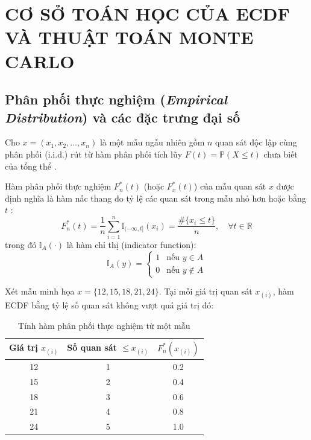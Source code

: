 	\section{CƠ SỞ TOÁN HỌC CỦA ECDF VÀ THUẬT TOÁN MONTE CARLO}
	
	\subsection{Phân phối thực nghiệm (\textit{Empirical Distribution}) và các đặc trưng đại số}
	Cho $x = (x_1, x_2, \dots, x_n)$ là một mẫu ngẫu nhiên gồm $n$ quan sát độc lập cùng phân phối (i.i.d.) rút từ hàm phân phối tích lũy $F(t) = \mathbb{P}(X \le t)$ chưa biết của tổng thể \cite{buithuytrang2026}.
	
	\begin{definition}
		Hàm phân phối thực nghiệm $F_n^*(t)$ (hoặc $F_x^*(t)$) của mẫu quan sát $x$ được định nghĩa là hàm nấc thang đo tỷ lệ các quan sát trong mẫu nhỏ hơn hoặc bằng $t$ \cite{buithuytrang2026}:
		\begin{equation}
			F_n^*(t) = \frac{1}{n}\sum_{i=1}^{n} \mathbb{I}_{(-\infty, t]}(x_i) = \frac{\#\{x_i \le t\}}{n}, \quad \forall t \in \mathbb{R}
		\end{equation}
		trong đó $\mathbb{I}_A(\cdot)$ là hàm chỉ thị (indicator function):
		\begin{equation}
			\mathbb{I}_A(y) = \begin{cases} 
				1 & \text{nếu } y \in A \\ 
				0 & \text{nếu } y \notin A 
			\end{cases}
		\end{equation}
	\end{definition}
		Xét mẫu minh họa $x=\{12,15,18,21,24\}$. Tại mỗi giá trị quan sát
		$x_{(i)}$, hàm ECDF bằng tỷ lệ số quan sát không vượt quá giá trị đó:
		
		\begin{table}[htbp]
			\centering
			\caption{Tính hàm phân phối thực nghiệm từ một mẫu}
			\label{tab:ecdf-values}
			\begin{tabular}{ccc}
				\toprule
				Giá trị $x_{(i)}$ & Số quan sát $\leq x_{(i)}$ & $F_n^*(x_{(i)})$ \\
				\midrule
				12 & 1 & 0.2 \\
				15 & 2 & 0.4 \\
				18 & 3 & 0.6 \\
				21 & 4 & 0.8 \\
				24 & 5 & 1.0 \\
				\bottomrule
			\end{tabular}
		\end{table}
	
